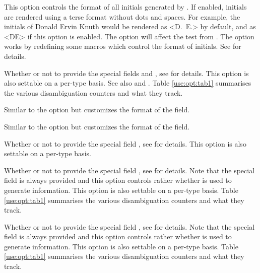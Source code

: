 \documentclass{ltxdockit}[2011/03/25]
\newcommand*{\biblatex}{\sty{biblatex}\xspace}
\begin{document}
\begin{optionlist}

This option controls the format of all initials generated by \biblatex. If enabled, initials are rendered using a terse format without dots and spaces. For example, the initials of Donald Ervin Knuth would be rendered as <D.~E.> by default, and as <DE> if this option is enabled. The option will affect the  test from . The option works by redefining some macros which control the format of initials. See  for details.


Whether or not to provide the special fields  and , see  for details.
This option is also settable on a per-type basis. See also  and . Table \ref{use:opt:tab1} summarises the various  disambiguation counters and what they track.


Similar to the  option but customizes the format of the  field.


Similar to the  option but customizes the format of the  field.


Whether or not to provide the special field , see  for details.
This option is also settable on a per-type basis.


Whether or not to provide the special field , see  for details. Note that the special field  is always provided and this option controls rather whether  is used to generate  information. This option is also settable on a per-type basis. Table \ref{use:opt:tab1} summarises the various  disambiguation counters and what they track.


Whether or not to provide the special field , see  for details. Note that the special field  is always provided and this option controls rather whether  is used to generate  information. This option is also settable on a per-type basis. Table \ref{use:opt:tab1} summarises the various  disambiguation counters and what they track.


\end{optionlist}
\end{document}
